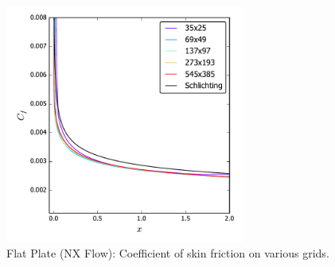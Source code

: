\begin{figure}[ht!]
\centering
  \includegraphics[width=0.7\textwidth]{figs/flatnx/cf_gridstudy.pdf}
  \caption{Flat Plate (NX Flow): Coefficient of skin friction on various grids.}
  \label{fig:nxflatcfstudy}
\end{figure}


